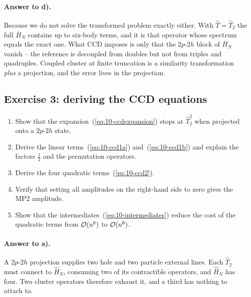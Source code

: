 \paragraph{Answer to d).}
Because we do not solve the transformed problem exactly either.  With
$\hat{T}=\hat{T}_2$ the full $\overline{H}_N$ contains up to six-body terms,
and it is that operator whose spectrum equals the exact one.  What CCD
imposes is only that the $2p$-$2h$ block of $\overline{H}_N$ vanish -- the
reference is decoupled from doubles but not from triples and quadruples.
Coupled cluster at finite truncation is a similarity transformation
\emph{plus} a projection, and the error lives in the projection.

\subsection*{Exercise 3: deriving the CCD equations}
\label{ex:10-ccd}

\begin{enumerate}
  \item[a)] Show that the expansion~(\ref{eq:10-ccdexpansion}) stops at
  $\hat{T}_2^2$ when projected onto a $2p$-$2h$ state.
  \item[b)] Derive the linear terms~(\ref{eq:10-ccd1a})
  and~(\ref{eq:10-ccd1b}) and explain the factors $\tfrac12$ and the
  permutation operators.
  \item[c)] Derive the four quadratic terms~(\ref{eq:10-ccd2}).
  \item[d)] Verify that setting all amplitudes on the right-hand side to zero
  gives the MP2 amplitude.
  \item[e)] Show that the intermediates~(\ref{eq:10-intermediates}) reduce
  the cost of the quadratic terms from $\mathcal{O}(n^8)$ to $\mathcal{O}(n^6)$.
\end{enumerate}

\paragraph{Answer to a).}
A $2p$-$2h$ projection supplies two hole and two particle external lines.
Each $\hat{T}_2$ must connect to $\hat{H}_N$, consuming two of its
contractible operators, and $\hat{H}_N$ has four.  Two cluster operators
therefore exhaust it, and a third has nothing to attach to.

